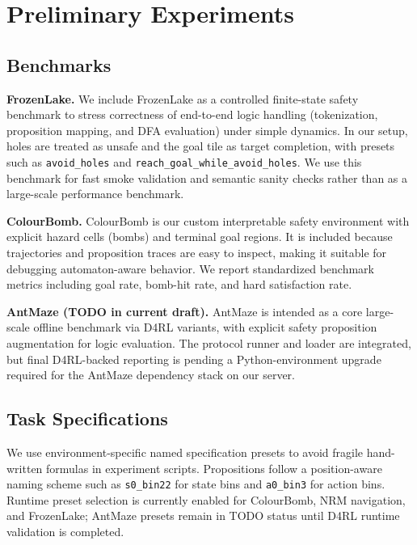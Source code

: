 \documentclass[runningheads]{llncs}
\begin{document}
\section{Preliminary Experiments}
\subsection{Benchmarks}
\textbf{FrozenLake.} We include FrozenLake as a controlled finite-state safety benchmark to stress correctness of end-to-end logic handling (tokenization, proposition mapping, and DFA evaluation) under simple dynamics. In our setup, holes are treated as unsafe and the goal tile as target completion, with presets such as \texttt{avoid\_holes} and \texttt{reach\_goal\_while\_avoid\_holes}. We use this benchmark for fast smoke validation and semantic sanity checks rather than as a large-scale performance benchmark.

\textbf{ColourBomb.} ColourBomb is our custom interpretable safety environment with explicit hazard cells (bombs) and terminal goal regions. It is included because trajectories and proposition traces are easy to inspect, making it suitable for debugging automaton-aware behavior. We report standardized benchmark metrics including goal rate, bomb-hit rate, and hard satisfaction rate.

\textbf{AntMaze (TODO in current draft).} AntMaze is intended as a core large-scale offline benchmark via D4RL variants, with explicit safety proposition augmentation for logic evaluation. The protocol runner and loader are integrated, but final D4RL-backed reporting is pending a Python-environment upgrade required for the AntMaze dependency stack on our server.

\subsection{Task Specifications}
We use environment-specific named specification presets to avoid fragile hand-written formulas in experiment scripts. Propositions follow a position-aware naming scheme such as \texttt{s0\_bin22} for state bins and \texttt{a0\_bin3} for action bins. Runtime preset selection is currently enabled for ColourBomb, NRM navigation, and FrozenLake; AntMaze presets remain in TODO status until D4RL runtime validation is completed.
\end{document}
